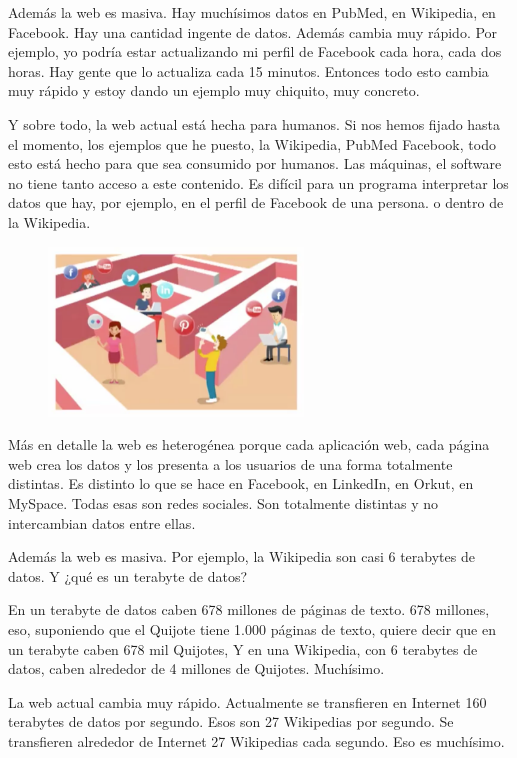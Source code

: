  
 
 Además la web es masiva. Hay muchísimos datos en PubMed, en Wikipedia, en Facebook. Hay una cantidad ingente de datos. Además cambia muy rápido. Por ejemplo, yo podría estar actualizando mi perfil de Facebook cada hora, cada dos horas. Hay gente que lo actualiza cada 15 minutos. Entonces todo esto cambia muy rápido y estoy dando un ejemplo muy chiquito, muy concreto.
 
 Y sobre todo, la web actual está hecha para humanos. Si nos hemos fijado hasta el momento, los ejemplos que he puesto, la Wikipedia, PubMed Facebook, todo esto está hecho para que sea consumido por humanos. Las máquinas, el software no tiene tanto acceso a este contenido. Es difícil para un programa interpretar los datos que hay, por ejemplo, en el perfil de Facebook de una persona. o dentro de la Wikipedia.
 
 \begin{figure}[H]
 	\centering
 	\includegraphics[height=4.5cm]{imagenes/capitulo3/2}
 	\caption{}
 	\label{}
 \end{figure}
 
 
 
 
 Más en detalle la web es heterogénea porque cada aplicación web, cada página web crea los datos y los presenta a los usuarios de una forma totalmente distintas. Es distinto lo que se hace en Facebook, en LinkedIn, en Orkut, en MySpace. Todas esas son redes sociales. Son totalmente distintas y no intercambian datos entre ellas.
 
 Además la web es masiva. Por ejemplo, la Wikipedia son casi 6 terabytes de datos. Y ¿qué es un terabyte de datos?
 
 En un terabyte de datos caben 678 millones de páginas de texto. 678 millones, eso, suponiendo que el Quijote tiene 1.000 páginas de texto, quiere decir que en un terabyte caben 678 mil Quijotes, Y en una Wikipedia, con 6 terabytes de datos, caben alrededor de 4 millones de Quijotes. Muchísimo.
 
 La web actual cambia muy rápido. Actualmente se transfieren en Internet 160 terabytes de datos por segundo. Esos son 27 Wikipedias por segundo. Se transfieren alrededor de Internet 27 Wikipedias cada segundo. Eso es muchísimo.
 
